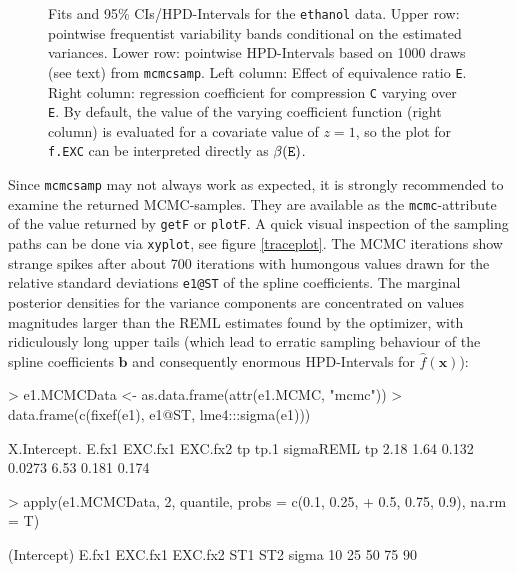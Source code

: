 \documentclass[12pt]{article}
\newenvironment{Schunk}{}{}
\newcommand{\code}[1]{\texttt{\small{#1}}}
\begin{document}
\begin{figure}[!htbp]
\begin{center}
\caption{Fits and 95\% CIs/HPD-Intervals for the \code{ethanol} data.
Upper row: pointwise frequentist variability bands
conditional on the estimated variances. Lower row: pointwise HPD-Intervals based
on 1000 draws (see text) from \code{mcmcsamp}.
Left column: Effect of equivalence ratio \code{E}. Right column: 
regression coefficient for compression \code{C} varying over \code{E}.    
By default, the value of the varying
coefficient function (right column) is evaluated for a covariate value of $z=1$,
so the plot for \code{f.EXC} can be interpreted directly as
$\beta(\text{\texttt{E}})$.  \label{plotEthanolCIs}}
\end{center}
\end{figure}

Since \code{mcmcsamp} may not always work as expected, it is strongly
recommended to examine the returned MCMC-samples. They are available as the
\code{mcmc}-attribute of the value returned by \code{getF} or \code{plotF}. A
quick visual inspection of the sampling paths can be done via \code{xyplot}, 
see figure \ref{traceplot}.
The MCMC iterations show strange spikes after about 700 iterations with
humongous values drawn for the relative standard deviations \code{e1@ST} of the spline
coefficients. The marginal posterior densities for the variance components are concentrated on values magnitudes larger than
the REML estimates found by the optimizer, with ridiculously long upper tails
(which lead to erratic sampling behaviour of the spline coefficients $\bm b$ and
consequently enormous HPD-Intervals for $\hat f(\bm x)$):
\begin{Schunk}
\begin{Sinput}
> e1.MCMCData <- as.data.frame(attr(e1.MCMC, "mcmc"))
> data.frame(c(fixef(e1), e1@ST, lme4:::sigma(e1)))
\end{Sinput}
\begin{Soutput}
   X.Intercept. E.fx1 EXC.fx1 EXC.fx2   tp  tp.1 sigmaREML
tp         2.18  1.64   0.132  0.0273 6.53 0.181     0.174
\end{Soutput}
\begin{Sinput}
> apply(e1.MCMCData, 2, quantile, probs = c(0.1, 0.25, 
+     0.5, 0.75, 0.9), na.rm = T)
\end{Sinput}
\begin{Soutput}
    (Intercept)  E.fx1 EXC.fx1 EXC.fx2      ST1      ST2 sigma
10%
25%
50%
75%
90%
\end{Soutput}
\end{Schunk}
\end{document}
